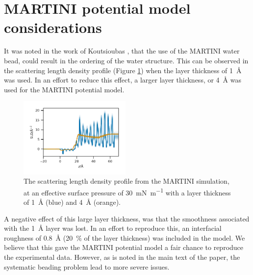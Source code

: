 \documentclass[amsmath,amssymb,superscriptaddress]{revtex4-1}
\begin{document}
\section{MARTINI potential model considerations}
It was noted in the work of Koutsioubas \cite{Koutsioubas2016}, that the use of the MARTINI water bead, could result in the ordering of the water structure.
This can be observed in the scattering length density profile (Figure \ref{fig:mart}) when the layer thickness of \SI{1}{\angstrom} was used.
In an effort to reduce this effect, a larger layer thickness, or \SI{4}{\angstrom} was used for the MARTINI potential model.
%
\begin{figure}
 \centering
 \includegraphics[width=0.49\textwidth]{martiniorder}
 \caption{The scattering length density profile from the MARTINI simulation, at an effective surface pressure of \SI{30}{\milli\newton\per\meter} with a layer thickness of \SI{1}{\angstrom} (blue) and \SI{4}{\angstrom} (orange). }
 \label{fig:mart}
\end{figure}
%

A negative effect of this large layer thickness, was that the smoothness associated with the \SI{1}{\angstrom} layer was lost.
In an effort to reproduce this, an interfacial roughness of \SI{0.8}{\angstrom} (\SI{20}{\percent} of the layer thickness) was included in the model.
We believe that this gave the MARTINI potential model a fair chance to reproduce the experimental data.
However, as is noted in the main text of the paper, the systematic beading problem lead to more severe issues.
\end{document}
